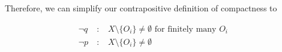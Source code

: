 \documentclass[12pt]{article}
\begin{document}
Therefore, we can simplify our contrapositive definition of compactness to

\begin{align*}
	\neg q ~&:~ \text{ $X \setminus \{O_i\} \neq \emptyset$ for finitely many $O_i$ } \\
	\neg p ~&:~ \text{ $X \setminus \{O_i\} \neq \emptyset$ }
\end{align*}
\end{document}
